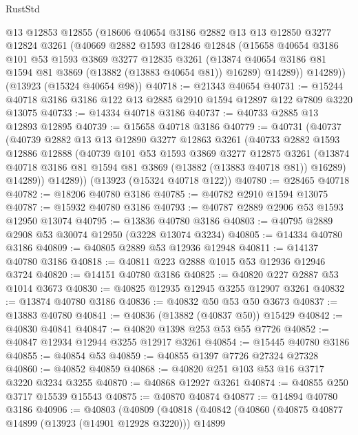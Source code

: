 \begin{lexlean}{RustStd}
\begin{coremodule}
      @13
      @12853
      @12855
      (@18606
        @40654
        @3186
        @2882
        @13
        @13
        @12850
        @3277
        @12824
        @3261
        (@40669
          @2882
          @1593
          @12846
          @12848
          (@15658
            @40654
            @3186
            @101
            @53
            @1593
            @3869
            @3277
            @12835
            @3261
            (@13874 @40654 @3186 @81 @1594 @81 @3869 (@13882 (@13883 @40654 @81)) @16289)
            @14289))
        @14289))
    (@13923 (@15324 @40654 @98))
@40718 := @21343 @40654
@40731 := @15244 @40718 @3186 @3186 @122 @13 @2885 @2910 @1594 @12897 @122 @7809 @3220 @13075
@40733 := @14334 @40718 @3186
@40737 := @40733 @2885 @13 @12893 @12895
@40739 := @15658 @40718 @3186
@40779 := @40731
    (@40737
      (@40739
        @2882
        @13
        @13
        @12890
        @3277
        @12863
        @3261
        (@40733
          @2882
          @1593
          @12886
          @12888
          (@40739
            @101
            @53
            @1593
            @3869
            @3277
            @12875
            @3261
            (@13874 @40718 @3186 @81 @1594 @81 @3869 (@13882 (@13883 @40718 @81)) @16289)
            @14289))
        @14289))
    (@13923 (@15324 @40718 @122))
@40780 := @28465 @40718
@40782 := @18206 @40780 @3186
@40785 := @40782 @2910 @1594 @13075
@40787 := @15932 @40780 @3186
@40793 := @40787 @2889 @2906 @53 @1593 @12950 @13074
@40795 := @13836 @40780 @3186
@40803 := @40795 @2889 @2908 @53 @30074 @12950 (@3228 @13074 @3234)
@40805 := @14334 @40780 @3186
@40809 := @40805 @2889 @53 @12936 @12948
@40811 := @14137 @40780 @3186
@40818 := @40811 @223 @2888 @1015 @53 @12936 @12946 @3724
@40820 := @14151 @40780 @3186
@40825 := @40820 @227 @2887 @53 @1014 @3673
@40830 := @40825 @12935 @12945 @3255 @12907 @3261
@40832 := @13874 @40780 @3186
@40836 := @40832 @50 @53 @50 @3673
@40837 := @13883 @40780
@40841 := @40836 (@13882 (@40837 @50)) @15429
@40842 := @40830 @40841
@40847 := @40820 @1398 @253 @53 @55 @7726
@40852 := @40847 @12934 @12944 @3255 @12917 @3261
@40854 := @15445 @40780 @3186
@40855 := @40854 @53
@40859 := @40855 @1397 @7726 @27324 @27328
@40860 := @40852 @40859
@40868 := @40820 @251 @103 @53 @16 @3717 @3220 @3234 @3255
@40870 := @40868 @12927 @3261
@40874 := @40855 @250 @3717 @15539 @15543
@40875 := @40870 @40874
@40877 := @14894 @40780 @3186
@40906 := @40803
    (@40809
      (@40818
        (@40842
          (@40860
            (@40875 @40877 @14899 (@13923 (@14901 @12928 @3220)))
            @14899

\end{coremodule}
\end{lexlean}
